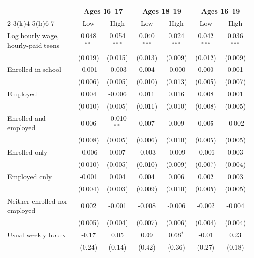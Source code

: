 \begin{tabular}{lcccccc}
\toprule
 & \multicolumn{2}{c}{Ages 16--17} & \multicolumn{2}{c}{Ages 18--19} & \multicolumn{2}{c}{Ages 16--19} \\
\cmidrule(lr){2-3}\cmidrule(lr){4-5}\cmidrule(lr){6-7}
 & Low & High & Low & High & Low & High \\
\midrule
Log hourly wage, hourly-paid teens & 0.048$^{**}$ & 0.054$^{***}$ & 0.040$^{***}$ & 0.024$^{***}$ & 0.042$^{***}$ & 0.036$^{***}$ \\
 & (0.019) & (0.015) & (0.013) & (0.009) & (0.012) & (0.009) \\
Enrolled in school & -0.001 & -0.003 & 0.004 & -0.000 & 0.000 & 0.001 \\
 & (0.006) & (0.005) & (0.010) & (0.013) & (0.005) & (0.007) \\
Employed & 0.004 & -0.006 & 0.011 & 0.016 & 0.008 & 0.001 \\
 & (0.010) & (0.005) & (0.011) & (0.010) & (0.008) & (0.005) \\
Enrolled and employed & 0.006 & -0.010$^{**}$ & 0.007 & 0.009 & 0.006 & -0.002 \\
 & (0.008) & (0.005) & (0.006) & (0.010) & (0.005) & (0.005) \\
Enrolled only & -0.006 & 0.007 & -0.003 & -0.009 & -0.006 & 0.003 \\
 & (0.010) & (0.005) & (0.010) & (0.009) & (0.007) & (0.004) \\
Employed only & -0.001 & 0.004 & 0.004 & 0.006 & 0.002 & 0.003 \\
 & (0.004) & (0.003) & (0.009) & (0.010) & (0.005) & (0.005) \\
Neither enrolled nor employed & 0.002 & -0.001 & -0.008 & -0.006 & -0.002 & -0.004 \\
 & (0.005) & (0.004) & (0.007) & (0.006) & (0.004) & (0.004) \\
Usual weekly hours & -0.17 & 0.05 & 0.09 & 0.68$^{*}$ & -0.01 & 0.23 \\
 & (0.24) & (0.14) & (0.42) & (0.36) & (0.27) & (0.18) \\
\bottomrule
\end{tabular}
